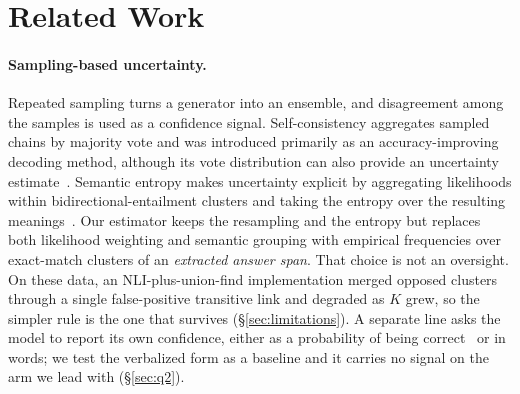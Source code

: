 \documentclass[10pt,twocolumn,letterpaper]{article}
\begin{document}
\section{Related Work}
%
\paragraph{Sampling-based uncertainty.}
Repeated sampling turns a generator into an ensemble, and disagreement
among the samples is used as a confidence signal. Self-consistency
aggregates sampled chains by majority vote and was introduced primarily
as an accuracy-improving decoding method, although its vote distribution
can also provide an uncertainty estimate~\cite{selfconsistency}. Semantic
entropy makes uncertainty explicit by aggregating likelihoods within
bidirectional-entailment clusters and taking the entropy over the
resulting meanings~\cite{semanticentropy}. Our estimator keeps the
resampling and the entropy but replaces both likelihood weighting and
semantic grouping with empirical frequencies over exact-match clusters of
an \emph{extracted answer span}. That choice is not an oversight. On these
data, an NLI-plus-union-find implementation merged opposed clusters through a
single false-positive transitive link and degraded as $K$ grew, so the
simpler rule is the one that survives (\S\ref{sec:limitations}). A
separate line asks the model to report its own confidence, either as a
probability of being correct~\cite{kadavath} or in words; we test the
verbalized form as a baseline and it carries no signal on the arm we lead
with (\S\ref{sec:q2}).
\end{document}
